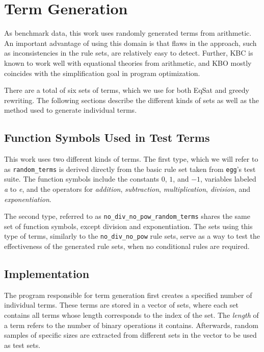 \section{Term Generation}
\label{sec:term-generation}
As benchmark data, this work uses randomly generated terms from arithmetic. An important advantage of using this domain is that flaws in the approach, such as inconsistencies in the rule sets, are relatively easy to detect. Further, KBC is known to work well with equational theories from arithmetic, and KBO mostly coincides with the simplification goal in program optimization.

There are a total of six sets of terms, which we use for both EqSat and greedy rewriting. The following sections describe the different kinds of sets as well as the method used to generate individual terms.

\subsection{Function Symbols Used in Test Terms}
\label{sec:function_symbols}
This work uses two different kinds of terms. The first type, which we will refer to as \texttt{random\_terms} is derived directly from the basic rule set taken from \texttt{egg}'s test suite. The function symbols include the constants $0$, $1$, and $-1$, variables labeled \emph{a} to \emph{e}, and the operators for \emph{addition}, \emph{subtraction}, \emph{multiplication}, \emph{division}, and \emph{exponentiation}. 

The second type, referred to as \texttt{no\_div\_no\_pow\_random\_terms} shares the same set of function symbols, except division and exponentiation. The sets using this type of terms, similarly to the \texttt{no\_div\_no\_pow} rule sets, serve as a way to test the effectiveness of the generated rule sets, when no conditional rules are required.

\subsection{Implementation}
The program responsible for term generation first creates a specified number of individual terms. These terms are stored in a vector of sets, where each set contains all terms whose length corresponds to the index of the set. The \emph{length} of a term refers to the number of binary operations it contains. Afterwards, random samples of specific sizes are extracted from different sets in the vector to be used as test sets.

